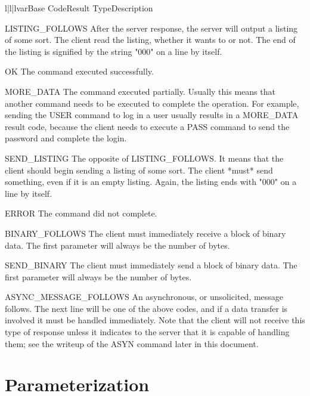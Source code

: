 \begin{tableiii}{l|l|l}{var}{Base Code}{Result Type}{Description}


    {LISTING_FOLLOWS}
    {After the server response, the server will output a listing of some sort.
    The client  read the listing, whether it wants to or not.  The
    end of the listing is signified by the string "000" on a line by itself.}

    {OK}
    {The command executed successfully.}

    {MORE_DATA}
    {The command executed partially.  Usually this means that another command
    needs to be executed to complete the operation.  For example, sending the
    USER command to log in a user usually results in a MORE_DATA result code,
    because the client needs to execute a PASS command to send the password and
    complete the login.}

    {SEND_LISTING}
    {The opposite of LISTING_FOLLOWS.  It means that the client should begin
    sending a listing of some sort.  The client *must* send something, even if
    it is an empty listing.  Again, the listing ends with "000" on a line by
    itself.}

    {ERROR}
    {The command did not complete.}

    {BINARY_FOLLOWS}
    {The client must immediately receive a block of binary data.  The first
    parameter will always be the number of bytes.}

    {SEND_BINARY}
    {The client must immediately send a block of binary data.  The first
    parameter will always be the number of bytes.}

    {ASYNC_MESSAGE_FOLLOWS}
    {An asynchronous, or unsolicited, message follows.  The next line will be
    one of the above codes, and if a data transfer is involved it must be
    handled immediately.  Note that the client will not receive this type of
    response unless it indicates to the server that it is capable of handling
    them; see the writeup of the ASYN command later in this document.}

\end{tableiii}



\section{Parameterization}

